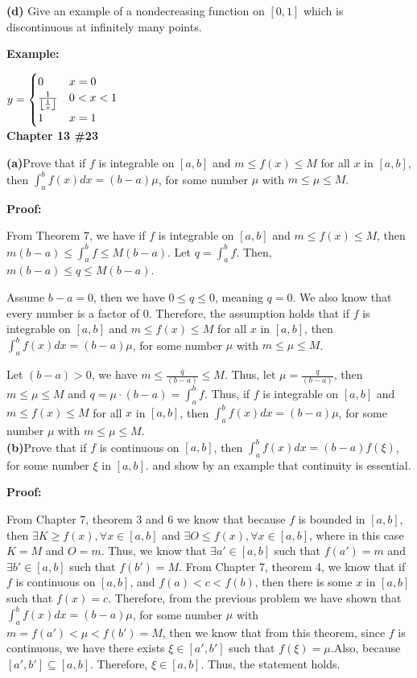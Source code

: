 \documentclass[a4paper,12pt]{report}
\DeclarePairedDelimiter\floor{\lfloor}{\rfloor}
\begin{document}
\noindent
\textbf{(d)} Give an example of a nondecreasing function on $[0,1]$ which is discontinuous at infinitely many points. 

\noindent
\textbf{Example: }

 $y =
    \begin{cases}
      0 & x=0\\
      \frac{1}{\floor*{\frac{1}{x}}} & 0<x<1\\
      1 & x=1
    \end{cases}  $\\
    
\noindent
\textbf{Chapter 13 \#23}

\noindent
\textbf{(a)}Prove that if $f$ is integrable on $[a,b]$ and $m\leq f(x)\leq M$ for all $x$ in $[a,b]$, then $\int_a^bf(x)dx=(b-a)\mu$, for some number $\mu$ with $m\leq \mu\leq M$.

\noindent
\textbf{Proof:}

\noindent
From Theorem 7, we have if $f$ is integrable on $[a,b]$ and $m\leq f(x)\leq M$, then $m(b-a)\leq \int_{a}^{b}f\leq M(b-a)$. Let $q = \int_{a}^{b}f$. Then, $m(b-a)\leq q\leq M(b-a)$. 

\noindent
Assume $b-a=0$, then we have $0\leq q \leq 0$, meaning $q=0$. We also know that every number is a factor of $0$. Therefore, the assumption holds that if $f$ is integrable on $[a,b]$ and $m\leq f(x)\leq M$ for all $x$ in $[a,b]$, then $\int_a^bf(x)dx=(b-a)\mu$, for some number $\mu$ with $m\leq \mu\leq M$.

\noindent
Let $(b-a)>0$, we have $m\leq \frac{q}{(b-a)}\leq M$. Thus, let $\mu = \frac{q}{(b-a)}$, then $m\leq \mu\leq M$ and $q=\mu\cdot{(b-a)}=\int_{a}^{b}f$. Thus, if $f$ is integrable on $[a,b]$ and $m\leq f(x)\leq M$ for all $x$ in $[a,b]$, then $\int_a^bf(x)dx=(b-a)\mu$, for some number $\mu$ with $m\leq \mu\leq M$.\\

\noindent
\textbf{(b)}Prove that if $f$ is continuous on $[a,b]$, then $\int_a^bf(x)dx=(b-a)f(\xi)$, for some number $\xi$ in $[a,b]$. and show by an example that continuity is essential.

\noindent
\textbf{Proof: }

\noindent
From Chapter 7, theorem 3 and 6 we know that because $f$ is bounded in $[a,b]$, then $\exists K\geq f(x), \forall x \in [a,b]$ and $\exists O\leq f(x), \forall x \in [a,b]$, where in this case $K= M$ and $O=m$. Thus, we know that $\exists a' \in [a,b]$ such that $f(a')=m$ and $\exists b' \in [a,b]$ such that $f(b')=M$. From Chapter 7, theorem 4, we know that if $f$ is continuous on $[a,b]$, and $f(a)<c<f(b)$, then there is some $x$ in $[a,b]$ such that $f(x) = c$. Therefore, from the previous problem we have shown that $\int_a^bf(x)dx=(b-a)\mu$, for some number $\mu$ with $m=f(a')<\mu<f(b')=M$, then we know that from this theorem, since $f$ is continuous, we have there exists $\xi \in [a',b']$ such that $f(\xi )=\mu$.Also, because $[a',b']\subseteq [a,b]$. Therefore, $\xi \in [a,b]$. Thus, the statement holds.
\end{document}
